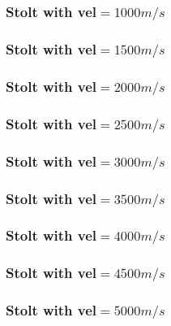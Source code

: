\begin{frame} \frametitle{Stolt with vel$=1000m/s$}
\end{frame}
\begin{frame} \frametitle{Stolt with vel$=1500m/s$}
\end{frame}
\begin{frame} \frametitle{Stolt with vel$=2000m/s$}
\end{frame}
\begin{frame} \frametitle{Stolt with vel$=2500m/s$}
\end{frame}
\begin{frame} \frametitle{Stolt with vel$=3000m/s$}
\end{frame}
\begin{frame} \frametitle{Stolt with vel$=3500m/s$}
\end{frame}
\begin{frame} \frametitle{Stolt with vel$=4000m/s$}
\end{frame}
\begin{frame} \frametitle{Stolt with vel$=4500m/s$}
\end{frame}
\begin{frame} \frametitle{Stolt with vel$=5000m/s$}
\end{frame}

